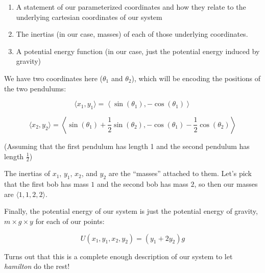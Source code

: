 \documentclass[]{article}
\begin{document}
\begin{enumerate}
\def\labelenumi{\arabic{enumi}.}
\item
  A statement of our parameterized coordinates and how they relate to the
  underlying cartesian coordinates of our system
\item
  The inertias (in our case, masses) of each of those underlying coordinates.
\item
  A potential energy function (in our case, just the potential energy induced by
  gravity)
\end{enumerate}

We have two coordinates here (\(\theta_1\) and \(\theta_2\)), which will be
encoding the positions of the two pendulums:

\[
\langle x_1, y_1 \rangle =
  \left\langle \sin (\theta_1), - \cos (\theta_1) \right\rangle
\]

\[
\langle x_2, y_2 \rangle =
  \left\langle \sin (\theta_1) + \frac{1}{2} \sin (\theta_2),
    - \cos (\theta_1) - \frac{1}{2} \cos (\theta_2) \right\rangle
\]

(Assuming that the first pendulum has length 1 and the second pendulum has
length \(\frac{1}{2}\))

The inertias of \(x_1\), \(y_1\), \(x_2\), and \(y_2\) are the ``masses''
attached to them. Let's pick that the first bob has mass \(1\) and the second
bob has mass \(2\), so then our masses are \(\langle 1, 1, 2, 2 \rangle\).

Finally, the potential energy of our system is just the potential energy of
gravity, \(m \times g \times y\) for each of our points:

\[
U(x_1, y_1, x_2, y_2) = ( y_1 + 2 y_2 ) g
\]

Turns out that this is a complete enough description of our system to let
\emph{hamilton} do the rest!
\end{document}
